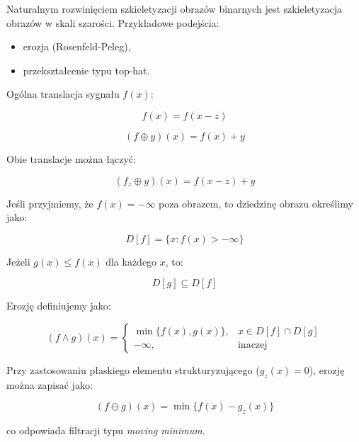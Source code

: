 Naturalnym rozwinięciem szkieletyzacji obrazów binarnych jest szkieletyzacja obrazów w skali szarości. Przykładowe podejścia:

\begin{itemize}
	\item erozja (Rosenfeld-Peleg),
	\item przekształcenie typu top-hat.
\end{itemize}

Ogólna translacja sygnału $f(x)$:

\begin{equation}
	f(x) = f(x - z)
\end{equation}

\begin{equation}
	(f \oplus y)(x) = f(x) + y
\end{equation}

Obie translacje można łączyć:

\begin{equation}
	(f_z \oplus y)(x) = f(x - z) + y
\end{equation}

Jeśli przyjmiemy, że $f(x) = -\infty$ poza obrazem, to dziedzinę obrazu określimy jako:

\begin{equation}
	D[f] = \{x : f(x) > -\infty\}
\end{equation}

Jeżeli $g(x) \leq f(x)$ dla każdego $x$, to:

\begin{equation}
	D[g] \subseteq D[f]
\end{equation}

Erozję definiujemy jako:

\begin{equation}
	(f \wedge g)(x) = 
	\begin{cases}
		\min\{f(x), g(x)\}, & x \in D[f] \cap D[g] \\
		-\infty, & \text{inaczej}
	\end{cases}
\end{equation}

Przy zastosowaniu płaskiego elementu strukturyzującego ($g_z(x) = 0$), erozję można zapisać jako:

\begin{equation}
	(f \ominus g)(x) = \min\{f(x) - g_z(x)\}
\end{equation}

co odpowiada filtracji typu \textit{moving minimum}.

